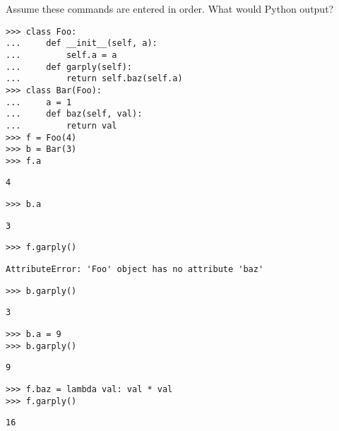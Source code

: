 \question Assume these commands are entered in order. What would
    Python output?

\begin{lstlisting}
>>> class Foo:
...     def __init__(self, a):
...         self.a = a
...     def garply(self):
...         return self.baz(self.a)
>>> class Bar(Foo):
...     a = 1
...     def baz(self, val):
...         return val
>>> f = Foo(4)
>>> b = Bar(3)
>>> f.a
\end{lstlisting}

\begin{solution}[0.25in]
\lstinline{4}
\end{solution}

\lstinline{>>> b.a}
\begin{solution}[0.25in]
\lstinline{3}
\end{solution}

\lstinline{>>> f.garply()}
\begin{solution}[0.25in]
\lstinline{AttributeError: 'Foo' object has no attribute 'baz'}
\end{solution}

\lstinline{>>> b.garply()}
\begin{solution}[0.25in]
\lstinline{3}
\end{solution}

\begin{lstlisting}
>>> b.a = 9
>>> b.garply()
\end{lstlisting}
\begin{solution}[0.25in]
\lstinline{9}
\end{solution}

\begin{lstlisting}
>>> f.baz = lambda val: val * val
>>> f.garply()
\end{lstlisting}

\begin{solution}[0.25in]
\lstinline{16}
\end{solution}

